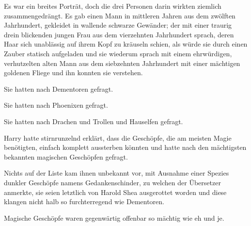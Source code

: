 Es war ein breites Porträt, doch die drei Personen darin wirkten ziemlich zusammengedrängt. Es gab einen Mann in mittleren Jahren aus dem zwölften Jahrhundert, gekleidet in wallende schwarze Gewänder; der mit einer traurig drein blickenden jungen Frau aus dem vierzehnten Jahrhundert sprach, deren Haar sich unablässig auf ihrem Kopf zu kräuseln schien, als würde sie durch einen Zauber statisch aufgeladen und sie wiederum sprach mit einem ehrwürdigen, verhutzelten alten Mann aus dem siebzehnten Jahrhundert mit einer mächtigen goldenen Fliege und ihn konnten sie verstehen.

Sie hatten nach Dementoren gefragt.

Sie hatten nach Phoenixen gefragt.

Sie hatten nach Drachen und Trollen und Hauselfen gefragt.

Harry hatte stirnrunzelnd erklärt, dass die Geschöpfe, die am meisten Magie benötigten, einfach komplett aussterben könnten und hatte nach den mächtigsten bekannten magischen Geschöpfen gefragt.

Nichts auf der Liste kam ihnen unbekannt vor, mit Ausnahme einer Spezies dunkler Geschöpfe namens Gedankenschinder, zu welchen der Übersetzer anmerkte, sie seien letztlich von Harold Shea ausgerottet worden und diese klangen nicht halb so furchterregend wie Dementoren.

Magische Geschöpfe waren gegenwärtig offenbar so mächtig wie eh und je.

